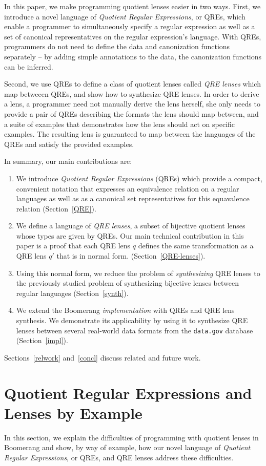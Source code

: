 \documentclass[acmsmall,review,anonymous]{acmart}\settopmatter{printfolios=true,printccs=false,printacmref=false}
\begin{document}
In this paper, we make programming quotient lenses easier in two ways. First, we
introduce a novel language of {\em Quotient Regular Expressions}, or QREs, which
enable a programmer to simultaneously specify a regular expression as well as
a set of canonical representatives on the regular expression's language. With
QREs, programmers do not need to define the data and canonization functions
separately -- by adding simple annotations to the data, the canonization
functions can be inferred.

Second, we use QREs to define a class of quotient lenses called {\em QRE
lenses} which map betweeen QREs, and show how to synthesize QRE lenses. In
order to derive a lens, a programmer need not manually derive the lens
herself, she only needs to provide a pair of QREs describing the formats the
lens should map between, and a suite of examples that demonstrates how the
lens should act on specific examples.  The resulting lens is guaranteed to
map between the languages of the QREs and satisfy the provided examples.

In summary, our main contributions are:
\begin{enumerate}
  \item We introduce {\em Quotient Regular Expressions} (QREs)
  which provide a compact, convenient notation that expresses an equivalence
  relation on a regular languages as well as as a canonical set representatives
  for this equavalence relation (Section~\ref{QRE}).
  \item We define a language of {\em QRE lenses}, a subset of bijective quotient
  lenses whose types are given by QREs. Our main technical contribution in this
  paper is a proof that each QRE lens $q$ defines the same transformation as a
  QRE lens $q'$ that is in normal form. (Section~\ref{QRE-lenses}).
  \item Using this normal form, we reduce the problem of {\em synthesizing}
  QRE lenses to the previously studied problem of synthesizing bijective lenses
  between regular languages (Section~\ref{synth}).
  \item We extend the Boomerang {\em implementation} with QREs
  and QRE lens synthesis.  We demonstrate its applicability by using it to
  synthesize QRE lenses between several real-world data formats from the
  {\tt data.gov} database (Section~\ref{impl}).
\end{enumerate}
Sections~\ref{relwork} and~\ref{concl} discuss related and future work.

\section{Quotient Regular Expressions and Lenses by Example}
\label{sec:example}
In this section, we explain the difficulties of programming with quotient lenses
in Boomerang and show, by way of example, how our novel language of {\em
Quotient Regular Expressions}, or QREs, and QRE lenses address these
difficulties.
\end{document}
